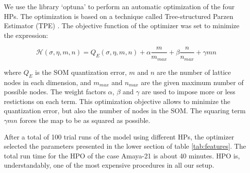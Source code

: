 We use the library `optuna' \citep{Akiba2019} to perform an automatic optimization of the four HPs. The optimization is based on a technique called Tree-structured Parzen Estimator (TPE) \citep{pmlr-v28-bergstra13}. The objective function of the optimizer was set to minimize the expression:

\begin{equation}
\mathcal{H}\left(\sigma, \eta, m, n\right) = Q_E(\sigma, \eta, m, n) + \alpha \frac{m}{m_{max}} + \beta \frac{n}{n_{max}} + \gamma m n \label{eq:hpo}
\end{equation}

where $Q_E$ is the SOM quantization error, $m$ and $n$ are the number of lattice nodes in each dimension, and $m_{max}$ and $n_{max}$ are the given maximum number of possible nodes. The weight factors $\alpha$, $\beta$ and $\gamma$ are used to impose more or less restictions on each term. This optimization objective allows to minimize the quantization error, but also the number of nodes in the SOM. The squaring term $\gamma m n$ forces the map to be as squared as possible.

After a total of 100 trial runs of the model using different HPs, the optimizer selected the parameters presented in the lower section of table \ref{tab:features}. The total run time for the HPO of the case Amaya-21 is about 40 minutes. HPO is, understandably, one of the most expensive procedures in all our setup.